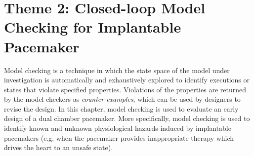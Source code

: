 



\chapter{Theme 2: Closed-loop Model Checking for Implantable Pacemaker}
\label{ModelChecking}
%

Model checking is a technique in which the state space of the model under investigation is automatically and exhaustively explored to identify executions or states that violate specified properties. Violations of the properties are returned by the model checkers as \emph{counter-examples}, which can be used by designers to revise the design. 
In this chapter, model checking is used to evaluate an early design of a dual chamber pacemaker. 
More specifically, model checking is used to identify known and unknown physiological hazards induced by implantable pacemakers (e.g. when the pacemaker provides inappropriate therapy which drives the heart to an unsafe state).  

